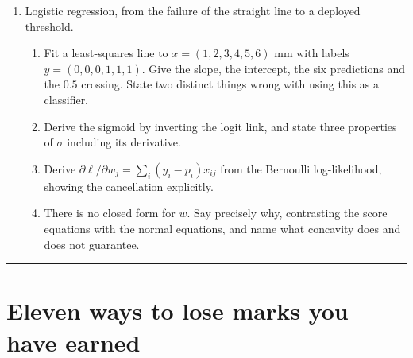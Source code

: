 \documentclass[11pt,a4paper]{article}
\begin{document}
\begin{enumerate}[label=\textbf{\arabic*.}, leftmargin=*, start=10]
\item Logistic regression, from the failure of the straight line to a deployed
  threshold.
  \begin{enumerate}[label=(\alph*)]
    \item Fit a least-squares line to $x = (1,2,3,4,5,6)$ mm with labels
      $y = (0,0,0,1,1,1)$. Give the slope, the intercept, the six predictions
      and the $0.5$ crossing. State two distinct things wrong with using this
      as a classifier. 
    \item Derive the sigmoid by inverting the logit link, and state three
      properties of $\sigma$ including its derivative. 
    \item Derive $\partial\ell/\partial w_j = \sum_i (y_i - p_i)x_{ij}$ from
      the Bernoulli log-likelihood, showing the cancellation explicitly.
    \item There is no closed form for $w$. Say precisely why, contrasting the
      score equations with the normal equations, and name what concavity does
      and does not guarantee. 
  \end{enumerate}
\end{enumerate}

\vspace{0.6em}\hrule\vspace{0.5em}

\section*{Eleven ways to lose marks you have earned}
\end{document}
